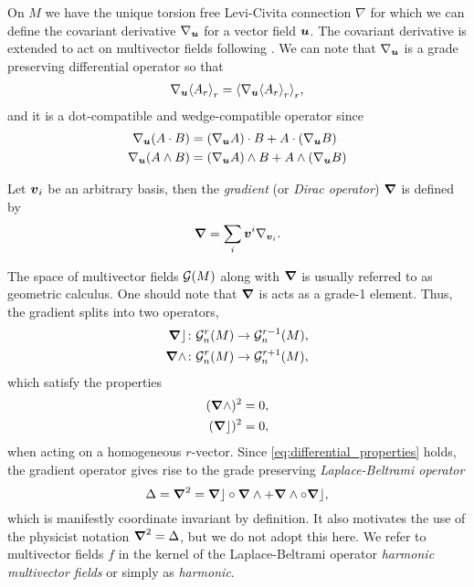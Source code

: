 On $M$ we have the unique torsion free Levi-Civita connection $\nabla$ for which we can define the covariant derivative $\nabla_{\boldsymbol{u}}$ for a vector field $\boldsymbol{u}$. The covariant derivative is extended to act on multivector fields following \cite{schindler_geometric_2020}. We can note that $\nabla_{\boldsymbol{u}}$ is a grade preserving differential operator so that
\begin{align}
    \nabla_{\blade{u}} \proj{r}{A_r} = \proj{r}{\nabla_{\blade{u}} \proj{r}{A_r}},
\end{align}
and it is a dot-compatible and wedge-compatible operator since
\begin{align}
    \nabla_{\boldsymbol{u}} (A\cdot B) &= (\nabla_{\boldsymbol{u}} A) \cdot B + A \cdot (\nabla_{\boldsymbol{u}} B)\\
    \nabla_{\boldsymbol{u}} (A\wedge B) &= (\nabla_{\boldsymbol{u}} A) \wedge B + A \wedge (\nabla_{\boldsymbol{u}} B)
\end{align}
\begin{definition}
    Let $\boldsymbol{v}_i$ be an arbitrary basis, then the \emph{gradient} (or \emph{Dirac operator}) $\boldsymbol{\nabla}$ is defined by
\begin{equation} 
\boldsymbol{\nabla} = \sum_{i} \boldsymbol{v}^i \nabla_{\boldsymbol{v}_i}.
\end{equation}
\end{definition}
The space of multivector fields $\mathcal{G}(M)$ along with $\boldsymbol{\nabla}$ is usually referred to as geometric calculus. One should note that $\boldsymbol{\nabla}$ is acts as a grade-1 element. Thus, the gradient splits into two operators, 
\begin{align}
\boldsymbol{\nabla} \rfloor &\colon \mathcal{G}_n^r(M) \to \mathcal{G}_n^{r-1}(M), \\
\boldsymbol{\nabla} \wedge &\colon \mathcal{G}_n^r(M) \to \mathcal{G}_n^{r+1}(M),
\end{align}
which satisfy the properties
\begin{align}
\label{eq:differential_properties}
(\boldsymbol{\nabla} \wedge)^2=0,\\
(\boldsymbol{\nabla} \rfloor)^2 = 0,
\end{align}
when acting on a homogeneous $r$-vector. Since \ref{eq:differential_properties} holds, the gradient operator gives rise to the grade preserving \emph{Laplace-Beltrami operator}
\[
\Delta = \boldsymbol{\nabla}^2 = \boldsymbol{\nabla} \rfloor \circ \boldsymbol{\nabla} \wedge + \boldsymbol{\nabla} \wedge \circ \boldsymbol{\nabla} \rfloor,
\]
which is manifestly coordinate invariant by definition.  It also motivates the use of the physicist notation $\boldsymbol{\nabla}^2=\Delta$, but we do not adopt this here.  We refer to multivector fields $f$ in the kernel of the Laplace-Beltrami operator \emph{harmonic multivector fields} or simply as \emph{harmonic}.

